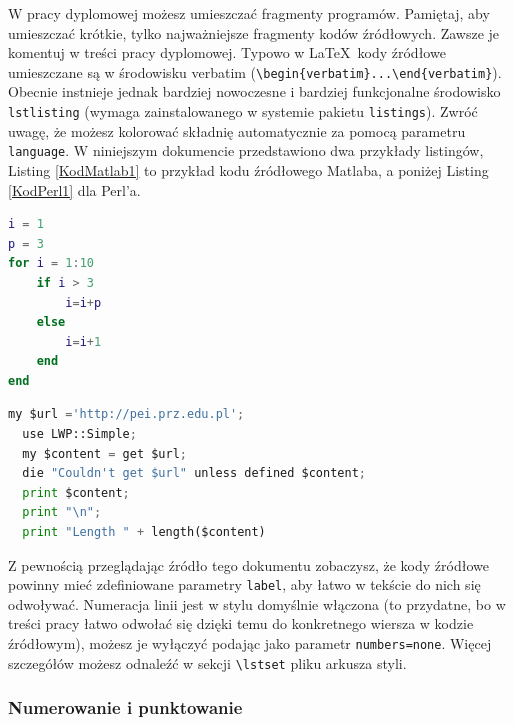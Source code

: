 \documentclass[12pt,twoside]{article}
\begin{document}
W pracy dyplomowej możesz umieszczać fragmenty programów. Pamiętaj, aby umieszczać krótkie, tylko najważniejsze fragmenty kodów źródłowych. Zawsze je komentuj w treści
pracy dyplomowej. Typowo w \LaTeX\ kody źródłowe umieszczane są w środowisku verbatim (\verb|\begin{verbatim}...\end{verbatim}|). Obecnie instnieje jednak bardziej nowoczesne i bardziej funkcjonalne środowisko \verb|lstlisting| (wymaga zainstalowanego w systemie pakietu \verb|listings|). Zwróć uwagę, że możesz kolorować składnię
automatycznie za pomocą parametru \verb|language|. W niniejszym dokumencie przedstawiono dwa przykłady listingów, Listing \ref{KodMatlab1} to przykład kodu źródłowego Matlaba, a poniżej Listing \ref{KodPerl1} dla Perl'a.\\

\begin{lstlisting}[language=Matlab,caption=Listing programu Matlab,label={KodMatlab1}]
i = 1
p = 3
for i = 1:10
    if i > 3
        i=i+p
    else 
        i=i+1
    end
end
\end{lstlisting}

\begin{lstlisting}[language=Python,caption=Listing programu Perl,label={KodPerl1}]
  my $url ='http://pei.prz.edu.pl';
  use LWP::Simple;
  my $content = get $url;
  die "Couldn't get $url" unless defined $content;
  print $content;
  print "\n";
  print "Length " + length($content)
\end{lstlisting}

Z pewnością przeglądając źródło tego dokumentu zobaczysz, że kody źródłowe powinny mieć zdefiniowane parametry \verb|label|, aby łatwo w tekście do nich się odwoływać.
Numeracja linii jest w stylu domyślnie włączona (to przydatne, bo w treści pracy łatwo odwołać się dzięki temu do konkretnego wiersza w kodzie źródłowym), możesz je wyłączyć podając jako parametr \verb|numbers=none|. Więcej szczegółów możesz odnaleźć w sekcji \verb|\lstset| pliku arkusza styli.


\subsubsection{Numerowanie i punktowanie}
\end{document}
